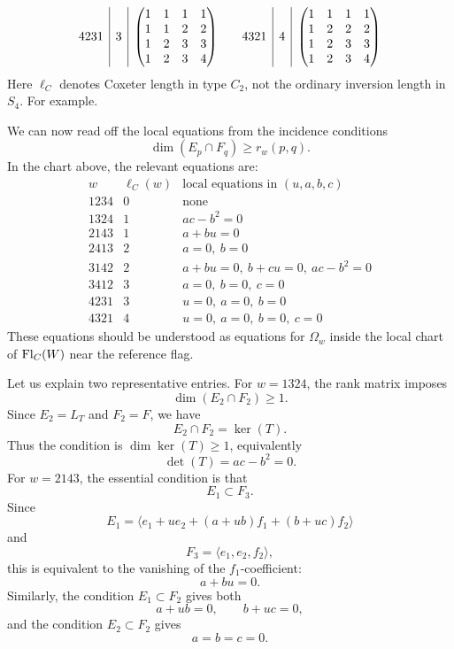 \documentclass[12pt]{article}
\begin{document}
\[\begin{array}{c|c|c@{\qquad}c|c|c}
    4231 & 3 &
    \begin{pmatrix}
        1&1&1&1\\
        1&1&2&2\\
        1&2&3&3\\
        1&2&3&4
    \end{pmatrix}
    &
    4321 & 4 &
    \begin{pmatrix}
        1&1&1&1\\
        1&2&2&2\\
        1&2&3&3\\
        1&2&3&4
    \end{pmatrix}
\end{array}
\]
Here $\ell_C$ denotes Coxeter length in type $C_2$, not the ordinary inversion length in $S_4$. For example.

We can now read off the local equations from the incidence conditions
\[
    \dim(E_p\cap F_q)\ge r_w(p,q).
\]
In the chart above, the relevant equations are:
\[
\begin{array}{c|c|c}
    w & \ell_C(w) & \text{local equations in }(u,a,b,c) \\
    \hline
    1234 & 0 & \text{none} \\
    1324 & 1 & ac-b^2=0 \\
    2143 & 1 & a+bu=0 \\
    2413 & 2 & a=0,\ b=0 \\
    3142 & 2 & a+bu=0,\ b+cu=0,\ ac-b^2=0 \\
    3412 & 3 & a=0,\ b=0,\ c=0 \\
    4231 & 3 & u=0,\ a=0,\ b=0 \\
    4321 & 4 & u=0,\ a=0,\ b=0,\ c=0
\end{array}
\]
These equations should be understood as equations for $\Omega_w$ inside the local chart of $\operatorname{Fl}_C(W)$ near the reference flag.

Let us explain two representative entries. For $w=1324$, the rank matrix imposes
\[
    \dim(E_2\cap F_2)\ge 1.
\]
Since $E_2=L_T$ and $F_2=F$, we have
\[
    E_2\cap F_2=\ker(T).
\]
Thus the condition is $\dim\ker(T)\ge 1$, equivalently
\[
    \det(T)=ac-b^2=0.
\]
For $w=2143$, the essential condition is that
\[
    E_1\subset F_3.
\]
Since
\[
    E_1=\langle e_1+u e_2+(a+ub)f_1+(b+uc)f_2\rangle
\]
and
\[
    F_3=\langle e_1,e_2,f_2\rangle,
\]
this is equivalent to the vanishing of the $f_1$-coefficient:
\[
    a+bu=0.
\]
Similarly, the condition $E_1\subset F_2$ gives both
\[
    a+ub=0,
    \qquad
    b+uc=0,
\]
and the condition $E_2\subset F_2$ gives
\[
    a=b=c=0.
\]
\end{document}
